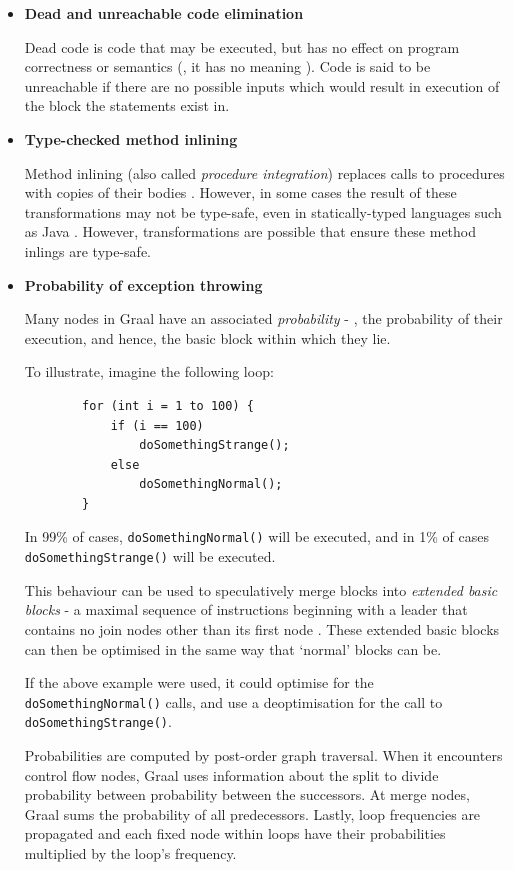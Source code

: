 \begin{itemize}
	\item \textbf{Dead and unreachable code elimination}
		
		Dead code is code that may be executed, but has no effect on program correctness or semantics (\ie, it has no meaning \citep[p.~533]{DragonBook}). Code is said to be unreachable if there are no possible inputs which would result in execution of the block the statements exist in.
	
	\item \textbf{Type-checked method inlining}
	
		Method inlining (also called \textit{procedure integration}) replaces calls to procedures with copies of their bodies \citep[p.~465]{ACDI}. However, in some cases the result of these transformations may not be type-safe, even in statically-typed languages such as Java \citep{Magnusson2002}. However, transformations are possible that ensure these method inlings are type-safe.
	
	\item \textbf{Probability of exception throwing}
		
		Many nodes in Graal have an associated \emph{probability} - \ie, the probability of their execution, and hence, the basic block within which they lie.
		
		To illustrate, imagine the following loop:
		
		\begin{verbatim}
		for (int i = 1 to 100) {
		    if (i == 100)
		        doSomethingStrange();
		    else
		        doSomethingNormal();
		}\end{verbatim}
		
		In 99\% of cases, \texttt{doSomethingNormal()} will be executed, and in 1\% of cases \texttt{doSomethingStrange()} will be executed.
		
		This behaviour can be used to speculatively merge blocks into \textit{extended basic blocks} - a maximal sequence of instructions beginning with a leader that contains no join nodes other than its first node \citep[p.~175]{ACDI}. These extended basic blocks can then be optimised in the same way that `normal' blocks can be.
		
		If the above example were used, it could optimise for the \texttt{doSomethingNormal()} calls, and use a deoptimisation for the call to \texttt{doSomethingStrange()}.
		
		Probabilities are computed by post-order graph traversal. When it encounters control flow nodes, Graal uses information about the split to divide probability between probability between the successors. At merge nodes, Graal sums the probability of all predecessors. Lastly, loop frequencies are propagated and each fixed node within loops have their probabilities multiplied by the loop's frequency.
		

\end{itemize}
